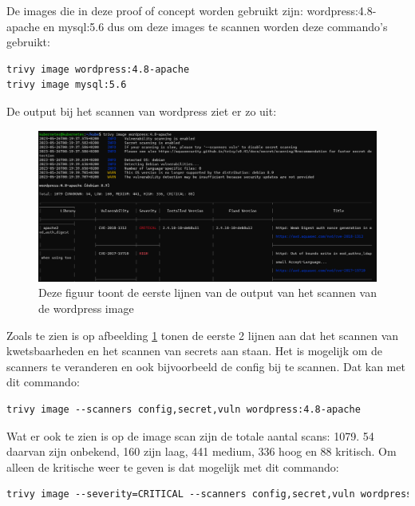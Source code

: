 De images die in deze proof of concept worden gebruikt zijn: wordpress:4.8-apache en mysql:5.6 dus om deze images te scannen worden deze commando's gebruikt:
\begin{lstlisting}[language=tex, caption={Trivy image scanning wordpress en mysql}]
trivy image wordpress:4.8-apache
trivy image mysql:5.6
\end{lstlisting}

De output bij het scannen van wordpress ziet er zo uit:
\begin{flushleft}
    \begin{figure}[h]
        \includegraphics[width=.95\textwidth]{graphics/outputwordpressimagescantrivy.png}
        \caption{\label{fig:TrivyWordpressImageScan}Deze figuur toont de eerste lijnen van de output van het scannen van de wordpress image}
    \end{figure} 
\end{flushleft}

Zoals te zien is op afbeelding \ref{fig:TrivyWordpressImageScan} tonen de eerste 2 lijnen aan dat het scannen van kwetsbaarheden en het scannen van secrets aan staan. Het is mogelijk om de scanners te veranderen en ook bijvoorbeeld de config bij te scannen. Dat kan met dit commando:
\begin{lstlisting}[language=tex, caption={Scannen van config, secret en kwetsbaarheden binnen wordpress image}]
trivy image --scanners config,secret,vuln wordpress:4.8-apache
\end{lstlisting}

Wat er ook te zien is op de image scan zijn de totale aantal scans: 1079. 54 daarvan zijn onbekend, 160 zijn laag, 441 medium, 336 hoog en 88 kritisch. Om alleen de kritische weer te geven is dat mogelijk met dit commando:
\begin{lstlisting}[language=tex, caption={Scannen van config, secret en kwetsbaarheden binnen wordpress image met kritische ernst}]
trivy image --severity=CRITICAL --scanners config,secret,vuln wordpress:4.8-apache
\end{lstlisting}

